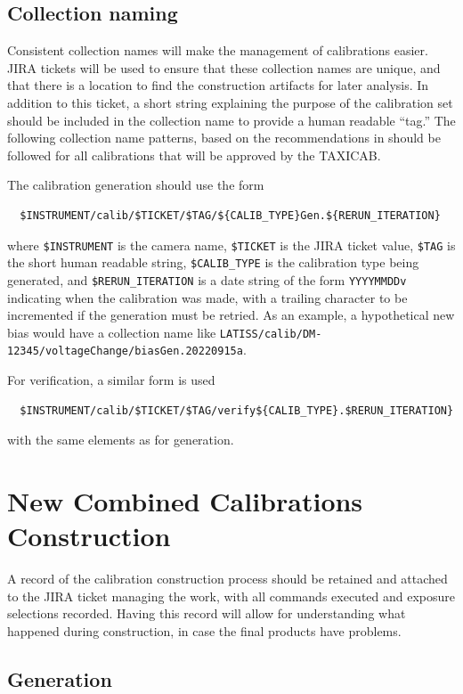 \documentclass[DM,authoryear,toc]{lsstdoc}
\begin{document}
\subsection{Collection naming}

Consistent collection names will make the management of calibrations easier.  JIRA tickets will be used to ensure that these collection names are unique, and that there is a location to find the construction artifacts for later analysis.  In addition to this ticket, a short string explaining the purpose of the calibration set should be included in the collection name to provide a human readable ``tag.''  The following collection name patterns, based on the recommendations in  should be followed for all calibrations that will be approved by the TAXICAB.

The calibration generation should use the form
\begin{verbatim}
  $INSTRUMENT/calib/$TICKET/$TAG/${CALIB_TYPE}Gen.${RERUN_ITERATION}
\end{verbatim}
where \verb|$INSTRUMENT| is the camera name, \verb|$TICKET| is the JIRA ticket value, \verb|$TAG| is the short human readable string, \verb|$CALIB_TYPE| is the calibration type being generated, and \verb|$RERUN_ITERATION| is a date string of the form \verb|YYYYMMDDv| indicating when the calibration was made, with a trailing character to be incremented if the generation must be retried.  As an example, a hypothetical new bias would have a collection name like \verb|LATISS/calib/DM-12345/voltageChange/biasGen.20220915a|.

For verification, a similar form is used
\begin{verbatim}
  $INSTRUMENT/calib/$TICKET/$TAG/verify${CALIB_TYPE}.$RERUN_ITERATION}
\end{verbatim}
with the same elements as for generation.


\section{New Combined Calibrations Construction}

A record of the calibration construction process should be retained and attached to the JIRA ticket managing the work, with all commands executed and exposure selections recorded.  Having this record will allow for understanding what happened during construction, in case the final products have problems.

\subsection{Generation}
\end{document}
